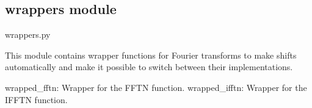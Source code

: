 \documentclass[letterpaper,10pt,english]{sphinxmanual}
\begin{document}
\begin{fulllineitems}
\label{\detokenize{source/web_interface:web_interface.index}}
\pysigstartsignatures
\pysiglinewithargsret
{}
{}
{}
\pysigstopsignatures
\end{fulllineitems}


\begin{fulllineitems}
\label{\detokenize{source/web_interface:web_interface.plot}}
\pysigstartsignatures
\pysiglinewithargsret
{}
{}
{}
\pysigstopsignatures
\end{fulllineitems}


\sphinxstepscope


\subsection{wrappers module}
\label{\detokenize{source/wrappers:module-wrappers}}\label{\detokenize{source/wrappers:wrappers-module}}\label{\detokenize{source/wrappers::doc}}
\sphinxAtStartPar
wrappers.py

\sphinxAtStartPar
This module contains wrapper functions for Fourier transforms to make shifts automatically and
make it possible to switch between their implementations.
\begin{description}
\sphinxAtStartPar
wrapped\_fftn: Wrapper for the FFTN function.
wrapped\_ifftn: Wrapper for the IFFTN function.

\end{description}

\begin{fulllineitems}
\label{\detokenize{source/wrappers:hpc_utils.wrapped_fft}}
\pysigstartsignatures
\pysiglinewithargsret
{}
{\sphinxparamcomma {}\sphinxparamcomma {}}
{}
\pysigstopsignatures
\end{fulllineitems}
\end{document}
